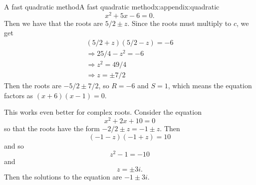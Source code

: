 \documentclass[oneside,10pt,]{book}
\numberwithin{equation}{section}
\numberwithin{equation}{section}
\begin{document}
\begin{appendixptx}{A fast quadratic method}{}{A fast quadratic method}{}{}{x:appendix:quadratic}
\begin{equation*}
x^2 + 5x - 6 = 0.
\end{equation*}
Then we have that the roots are \(5/2 \pm z\). Since the roots must multiply to \(c\), we get%
\begin{gather*}
(5/2 + z)(5/2 - z) = -6\\
\Rightarrow 25/4 - z^2 = -6 \\
\Rightarrow z^2 = 49/4 \\
\Rightarrow z = \pm 7/2
\end{gather*}
Then the roots are \(-5/2 \pm 7/2\), so \(R = -6\) and \(S = 1\), which means the equation factors as \((x + 6)(x -1) = 0\).%
\par
This works even better for complex roots. Consider the equation%
\begin{equation*}
x^2 + 2x + 10 = 0
\end{equation*}
so that the roots have the form \(-2/2 \pm z = -1 \pm z\). Then%
\begin{equation*}
(-1 - z)(-1 + z) = 10
\end{equation*}
and so%
\begin{equation*}
z^2 - 1 = -10
\end{equation*}
and%
\begin{equation*}
z = \pm 3i\text{.}
\end{equation*}
Then the solutions to the equation are \(-1 \pm 3i\).%
\end{appendixptx}
%
%
\typeout{************************************************}
\typeout{************************************************}
%
\end{document}
